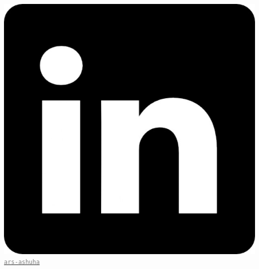 \documentclass[a4paper,10pt]{article} %
\begin{document}
{{\includegraphics[scale=0.01]{img/linkedin} \href{www.linkedin.com/in/ars-ashuha}{\textcolor{gray}{\texttt{ars-ashuha}}}}}
\setlength{\columnsep}{-330pt}
\end{document}

